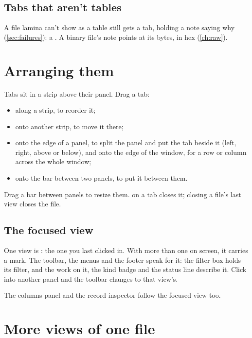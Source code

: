 \subsection{Tabs that aren't tables}\label{sec:note-tabs}

A file lamina can't show as a table still gets a tab, holding a note saying why (\cref{sec:failures}): a
. A binary file's note points at its bytes, in hex (\cref{ch:raw}).

\section{Arranging them}\label{sec:arranging}

Tabs sit in a strip above their panel. Drag a tab:

\begin{itemize}
\item along a strip, to reorder it;
\item onto another strip, to move it there;
\item onto the edge of a panel, to split the panel and put the tab beside it (left, right, above or
below), and onto the edge of the window, for a row or column across the whole window;
\item onto the bar between two panels, to put it between them.
\end{itemize}

Drag a bar between panels to resize them.  on a tab closes it; closing a file's last view closes
the file.

\subsection{The focused view}\label{sec:focus}

One view is : the one you last clicked in. With more than one on screen, it carries a mark.
The toolbar, the menus and the footer speak for it: the filter box holds its filter,  and the
 work on it, the kind badge and the status line describe it. Click into another panel and the
toolbar changes to that view's.

The columns panel and the record inspector follow the focused view too.

\section{More views of one file}\label{sec:new-view}

